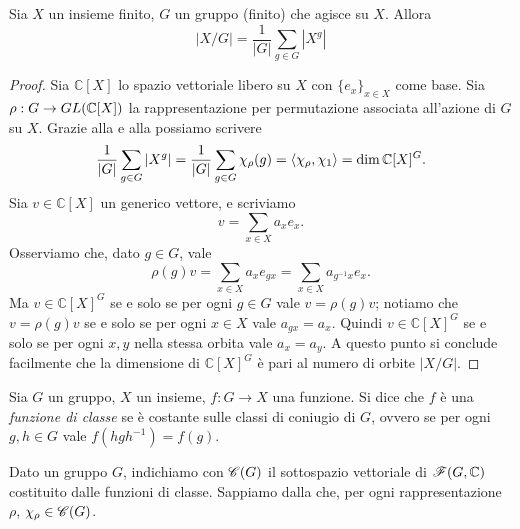 \begin{proposition}
Sia $X$ un insieme finito, $G$ un gruppo (finito) che agisce su $X$. Allora
$$
|X/G|=\frac{1}{|G|}\sum_{g\in G}|X^g|
$$
\end{proposition}
\begin{proof}
Sia $\mathbb{C}[X]$ lo spazio vettoriale libero su $X$ con $\{e_x\}_{x\in X}$ come base. Sia $\rho:G\to GL(\mathbb{C}[X])$ la rappresentazione per permutazione associata all'azione di $G$ su $X$. Grazie alla  e alla  possiamo scrivere
$$
\frac{1}{|G|}\sum_{g\in G}|X^g|=\frac{1}{|G|}\sum_{g\in G}\chi_\rho(g)=\left\langle\chi_\rho,\chi_1\right\rangle=\dim\mathbb{C}[X]^G.
$$
Sia $v\in\mathbb{C}[X]$ un generico vettore, e scriviamo
$$
v=\sum_{x\in X}a_xe_x.
$$
Osserviamo che, dato $g\in G$, vale
$$
\rho(g)v=\sum_{x\in X}a_xe_{gx}=\sum_{x\in X}a_{g^{-1}x}e_x.
$$
Ma $v\in\mathbb{C}[X]^G$ se e solo se per ogni $g\in G$ vale $v=\rho(g)v$; notiamo che $v=\rho(g)v$ se e solo se per ogni $x\in X$ vale $a_{gx}=a_x$. Quindi $v\in\mathbb{C}[X]^G$ se e solo se per ogni $x,y$ nella stessa orbita vale $a_x=a_y$. A questo punto si conclude facilmente che la dimensione di $\mathbb{C}[X]^G$ è pari al numero di orbite $|X/G|$.
\end{proof}


\begin{definition}
Sia $G$ un gruppo, $X$ un insieme, $f:G\to X$ una funzione. Si dice che $f$ è una \emph{funzione di classe} se è costante sulle classi di coniugio di $G$, ovvero se per ogni $g,h\in G$ vale $f(hgh^{-1})=f(g)$.
\end{definition}

Dato un gruppo $G$, indichiamo con $\mathscr{C}(G)$ il sottospazio vettoriale di $\mathscr{F}(G,\mathbb{C})$ costituito dalle funzioni di classe. Sappiamo dalla  che, per ogni rappresentazione $\rho$, $\chi_\rho\in\mathscr{C}(G)$.

